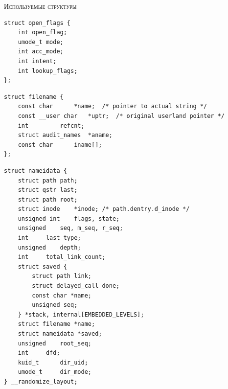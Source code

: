 \textsc{\huge Используемые структуры}
\begin{lstlisting}[caption={\text{Структура open\_flags}}]
struct open_flags {
	int open_flag;
	umode_t mode;
	int acc_mode;
	int intent;
	int lookup_flags;
};
\end{lstlisting}

\begin{lstlisting}[caption={\text{Структура filename}}]
struct filename {
	const char		*name;	/* pointer to actual string */
	const __user char	*uptr;	/* original userland pointer */
	int			refcnt;
	struct audit_names	*aname;
	const char		iname[];
};	
\end{lstlisting}

\begin{lstlisting}[caption={\text{Структура nameidata}}]
struct nameidata {
	struct path	path;
	struct qstr	last;
	struct path	root;
	struct inode	*inode; /* path.dentry.d_inode */
	unsigned int	flags, state;
	unsigned	seq, m_seq, r_seq;
	int		last_type;
	unsigned	depth;
	int		total_link_count;
	struct saved {
		struct path link;
		struct delayed_call done;
		const char *name;
		unsigned seq;
	} *stack, internal[EMBEDDED_LEVELS];
	struct filename	*name;
	struct nameidata *saved;
	unsigned	root_seq;
	int		dfd;
	kuid_t		dir_uid;
	umode_t		dir_mode;
} __randomize_layout;	
\end{lstlisting}



